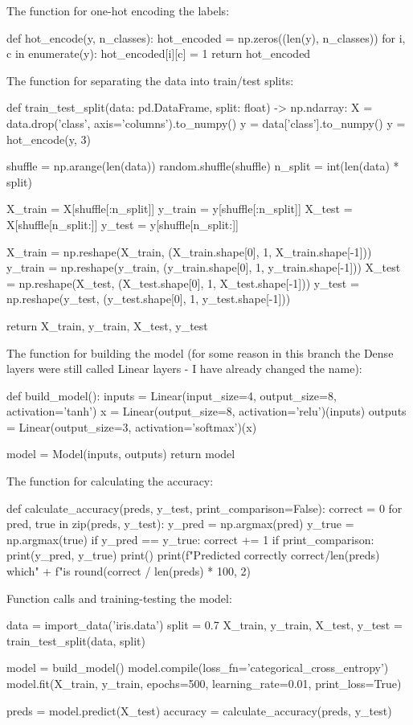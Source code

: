 \documentclass{article}
\begin{document}
The function for one-hot encoding the labels:
\begin{python}
def hot_encode(y, n_classes):
    hot_encoded = np.zeros((len(y), n_classes))
    for i, c in enumerate(y):
        hot_encoded[i][c] = 1
    return hot_encoded
\end{python}

The function for separating the data into train/test splits:
\begin{python}   
def train_test_split(data: pd.DataFrame, split: float) -> np.ndarray:
    X = data.drop('class', axis='columns').to_numpy()
    y = data['class'].to_numpy()
    y = hot_encode(y, 3)

    shuffle = np.arange(len(data))
    random.shuffle(shuffle)
    n_split = int(len(data) * split)

    X_train = X[shuffle[:n_split]]
    y_train = y[shuffle[:n_split]]
    X_test = X[shuffle[n_split:]]
    y_test = y[shuffle[n_split:]]

    X_train = np.reshape(X_train, (X_train.shape[0], 1, X_train.shape[-1]))
    y_train = np.reshape(y_train, (y_train.shape[0], 1, y_train.shape[-1]))
    X_test = np.reshape(X_test, (X_test.shape[0], 1, X_test.shape[-1]))
    y_test = np.reshape(y_test, (y_test.shape[0], 1, y_test.shape[-1]))

    return X_train, y_train, X_test, y_test
\end{python}

The function for building the model (for some reason in this branch the Dense layers were still called Linear layers - I have already changed the name):
\begin{python}
def build_model():
    inputs = Linear(input_size=4, output_size=8, activation='tanh')
    x = Linear(output_size=8, activation='relu')(inputs)
    outputs = Linear(output_size=3, activation='softmax')(x)

    model = Model(inputs, outputs)
    return model
\end{python}

The function for calculating the accuracy:
\begin{python}
def calculate_accuracy(preds, y_test, print_comparison=False):
    correct = 0
    for pred, true in zip(preds, y_test):
        y_pred = np.argmax(pred)
        y_true = np.argmax(true)
        if y_pred == y_true:
            correct += 1
        if print_comparison:
            print(y_pred, y_true)
    print()
    print(f"Predicted correctly {correct}/{len(preds)} which" +
          f"is {round(correct / len(preds) * 100, 2)}%
\end{python}

Function calls and training-testing the model:
\begin{python}
data = import_data('iris.data')
split = 0.7
X_train, y_train, X_test, y_test = train_test_split(data, split)

model = build_model()
model.compile(loss_fn='categorical_cross_entropy')
model.fit(X_train,
          y_train,
          epochs=500,
          learning_rate=0.01,
          print_loss=True)

preds = model.predict(X_test)
accuracy = calculate_accuracy(preds, y_test)
\end{python}
\end{document}
